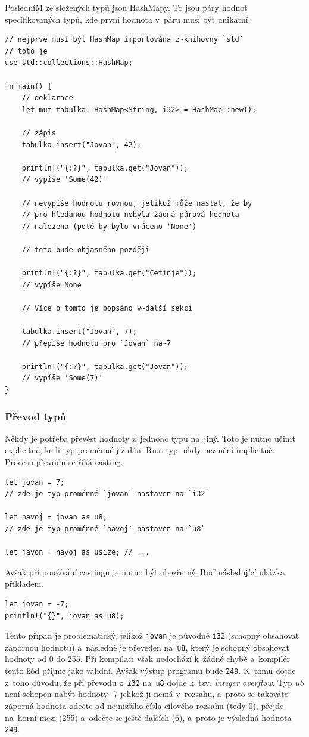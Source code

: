\documentclass[a4paper, 12pt]{article} %
\begin{document}
			PosledníM ze složených typů jsou HashMapy. To jsou páry hodnot specifikovaných typů, kde první hodnota v~páru musí být unikátní.
			\begin{verbatim}
// nejprve musí být HashMap importována z~knihovny `std`
// toto je 
use std::collections::HashMap;

fn main() {
	// deklarace
	let mut tabulka: HashMap<String, i32> = HashMap::new();

	// zápis
	tabulka.insert("Jovan", 42); 
	
	println!("{:?}", tabulka.get("Jovan"));
	// vypíše 'Some(42)'

	// nevypíše hodnotu rovnou, jelikož může nastat, že by
	// pro hledanou hodnotu nebyla žádná párová hodnota
	// nalezena (poté by bylo vráceno 'None')
	
	// toto bude objasněno později
	
	println!("{:?}", tabulka.get("Cetinje"));
	// vypíše None

	// Více o tomto je popsáno v~další sekci
	
	tabulka.insert("Jovan", 7);
	// přepíše hodnotu pro `Jovan` na~7
	
	println!("{:?}", tabulka.get("Jovan"));
	// vypíše 'Some(7)'
}
			\end{verbatim}
		
		\subsubsection*{Převod typů}
			Někdy je potřeba převést hodnoty z~jednoho typu na~jiný. Toto je nutno učinit explicitně, ke-li typ proměnné již dán. Rust typ nikdy nezmění implicitně. Procesu převodu se říká casting.
			\begin{verbatim}
let jovan = 7;
// zde je typ proměnné `jovan` nastaven na `i32` 

let navoj = jovan as u8;
// zde je typ proměnné `navoj` nastaven na `u8`

let javon = navoj as usize; // ...
			\end{verbatim}
			
			Avšak při používání castingu je nutno být obezřetný. Buď následující ukázka příkladem.
			\begin{verbatim}
let jovan = -7;
println!("{}", jovan as u8);
			\end{verbatim}
			
			Tento případ je problematický, jelikož \texttt{jovan} je původně \texttt{i32} (schopný obsahovat zápornou hodnotu) a~následně je převeden na~\texttt{u8}, který je schopný obsahovat hodnoty od 0 do 255. Při kompilaci však nedochází k~žádné chybě a~kompilér tento kód přijme jako validní. Avšak výstup programu bude \texttt{249}. K~tomu dojde z~toho důvodu, že při převodu z~\texttt{i32} na~\texttt{u8} dojde k~tzv. \textit{integer overflow}. Typ \textit{u8} není schopen nabýt hodnoty -7 jelikož ji nemá v~rozsahu, a~proto se takováto záporná hodnota odečte od nejnižšího čísla cílového rozsahu (tedy 0), přejde na~horní mezi (255) a~odečte se ještě dalších (6), a~proto je výsledná hodnota \texttt{249}.
			
\end{document}
